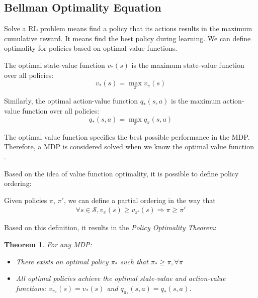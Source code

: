\subsection{Bellman Optimality Equation}

Solve a RL problem means find a policy that its actions results in the maximum cumulative reward. It means find the best policy during learning. We can define optimality for policies based on optimal value functions.

\begin{definition}
	The optimal state-value function $v_{*}(s)$ is the maximum state-value function over all policies:
	\begin{equation}
	v_{*}(s) = \max_{\pi} v_{\pi}(s)
	\end{equation}
	
	Similarly, the optimal action-value function $q_{*}(s,a)$ is the maximum action-value function over all policies:
	\begin{equation}
	q_{*}(s,a) = \max_{\pi} q_{\pi}(s,a)
	\end{equation}
\end{definition}

The optimal value function specifies the best possible performance in the MDP. Therefore, a MDP is considered solved when we know the optimal value function \cite{davidsilverlec2}.

Based on the idea of value function optimality, it is possible to define policy ordering:

\begin{definition}
	Given policies $\pi$, $\pi'$, we can define a partial ordering in the way that
	\begin{align*}
	\forall s \in \mathcal{S}, v_{\pi}(s) \geq v_{\pi'}(s) \Rightarrow \pi \geq \pi'
	\end{align*}
\end{definition}

Based on this definition, it results in the \textit{Policy Optimality Theorem}:

\newtheorem{optimalpolicy}{Theorem}
\begin{optimalpolicy}
	For any MDP:
	\begin{itemize}
		\item There exists an optimal policy $\pi_{*}$ such that $\pi_{*} \geq \pi, \forall \pi$
		\item All optimal policies achieve the optimal state-value and action-value functions: $v_{\pi_{*}}(s) = v_{*}(s)$ and $q_{\pi_{*}}(s,a) = q_{*}(s,a)$.
	\end{itemize}
\end{optimalpolicy}

